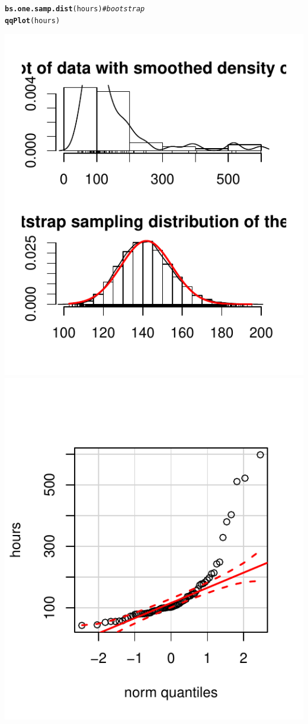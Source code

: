 \documentclass{article}\usepackage[]{graphicx}\usepackage[]{color}
\makeatletter
\def\maxwidth{ %
  \ifdim\Gin@nat@width>\linewidth
    \linewidth
  \else
    \Gin@nat@width
  \fi
}
\newcommand{\hlcom}[1]{\textcolor[rgb]{0.678,0.584,0.686}{\textit{#1}}}%
\newcommand{\hlstd}[1]{\textcolor[rgb]{0.345,0.345,0.345}{#1}}%
\newcommand{\hlkwd}[1]{\textcolor[rgb]{0.737,0.353,0.396}{\textbf{#1}}}%
\newenvironment{kframe}{%
 \def\at@end@of@kframe{}%
 \ifinner\ifhmode%
  \def\at@end@of@kframe{\end{minipage}}%
  \begin{minipage}{\columnwidth}%
 \fi\fi%
 \def\FrameCommand##1{\hskip\@totalleftmargin \hskip-\fboxsep
 \colorbox{shadecolor}{##1}\hskip-\fboxsep
     \hskip-\linewidth \hskip-\@totalleftmargin \hskip\columnwidth}%
 \MakeFramed {\advance\hsize-\width
   \@totalleftmargin\z@ \linewidth\hsize
   \@setminipage}}%
 {\par\unskip\endMakeFramed%
 \at@end@of@kframe}
\newenvironment{knitrout}{}{} %
\makeatother
\begin{document}
\begin{knitrout}
\color{fgcolor}\begin{kframe}
\begin{alltt}
\hlkwd{bs.one.samp.dist}\hlstd{(hours)} \hlcom{# bootstrap}
\hlkwd{qqPlot}\hlstd{(hours)}
\end{alltt}
\end{kframe}

{\centering \includegraphics[width=\maxwidth]{figure/2_a_boot-1} 
\includegraphics[width=\maxwidth]{figure/2_a_boot-2} 
}
\end{knitrout}
\end{document}
